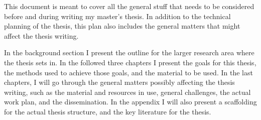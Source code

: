 This document is meant to cover all the general stuff that needs to be considered before and during writing my master's thesis. In addition to the technical planning of the thesis, this plan also includes the general matters that might affect the thesis writing.

In the background section I present the outline for the larger research area where the thesis sets in. In the followed three chapters I present the goals for this thesis, the methods used to achieve those goals, and the material to be used. In the last chapters, I will go through the general matters possibly affecting the thesis writing, such as the material and resources in use, general challenges, the actual work plan, and the dissemination. In the appendix I will also present a scaffolding for the actual thesis structure, and the key literature for the thesis.

